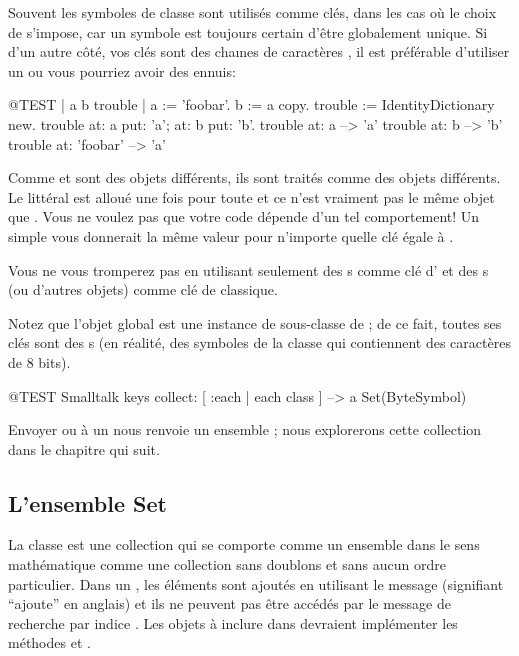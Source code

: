 \documentclass[a4paper,10pt,twoside]{book}
\begin{document}
Souvent les symboles de classe  sont utilis\'es comme cl\'es, dans les cas o\`u le choix de  s'impose, car un symbole est
toujours certain d'\^etre globalement unique.
Si d'un autre c\^ot\'e, vos cl\'es sont des cha{\i}nes de caract\`eres 
, il est pr\'ef\'erable d'utiliser un  ou vous pourriez avoir des ennuis:

\begin{code}{@TEST | a b trouble |}
a := 'foobar'.
b := a copy.
trouble := IdentityDictionary new.
trouble at: a put: 'a'; at: b put: 'b'.
trouble at: a          --> 'a'
trouble at: b          --> 'b'
trouble at: 'foobar' --> 'a'
\end{code}

\noindent
Comme  et  sont des objets diff\'erents, ils sont trait\'es comme des objets diff\'erents.
Le litt\'eral \mbox{} est allou\'e une fois pour toute et
ce n'est vraiment pas le m\^eme objet que .
Vous ne voulez pas que votre code d\'epende d'un tel comportement!
Un simple  vous donnerait la m\^eme valeur pour n'importe quelle
cl\'e \'egale \`a .

Vous ne vous tromperez pas en utilisant
seulement des s comme cl\'e d' et
des s (ou d'autres objets) comme cl\'e de  classique.

Notez que l'objet global  est une instance de  sous-classe de  ; de ce fait, toutes ses
cl\'es sont des s (en r\'ealit\'e, des symboles de la classe  qui contiennent des caract\`eres de 8 bits).

\begin{code}{@TEST}
Smalltalk keys collect: [ :each | each class ] --> a Set(ByteSymbol)
\end{code}
\noindent
Envoyer  ou  \`a un  nous renvoie 
un ensemble ; nous explorerons cette collection dans le chapitre
qui suit.

\subsection{L'ensemble Set}
La classe  est une collection qui se comporte comme un ensemble
dans le sens math\'ematique \ie comme une collection sans doublons
et sans aucun ordre particulier. Dans un , les \'el\'ements sont
ajout\'es en utilisant le message  (signifiant ``ajoute'' en anglais) et ils ne peuvent pas \^etre acc\'ed\'es par le message de recherche par indice . 
Les objets \`a inclure dans  devraient impl\'ementer les m\'ethodes  et \ct{=}.
\end{document}
